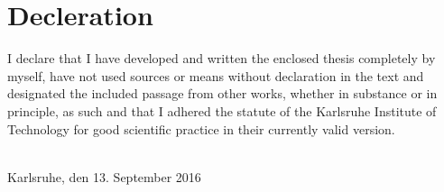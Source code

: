\thispagestyle{empty}


\vspace*{8cm}


\section*{Decleration}

 I declare that I have developed and written the enclosed thesis completely by myself, have not used sources or means without declaration in the text and designated the included passage from other works, whether in substance or in principle, as such and that I adhered the statute of the Karlsruhe Institute of Technology for good scientific practice in their currently valid version.


~\\[2ex] 
\noindent
Karlsruhe, den 13. September 2016
~\\[5ex]
